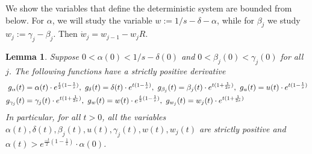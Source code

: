 \documentclass[a4paper,12pt]{article}
\newtheorem{lemma}{Lemma}
\begin{document}
We show the variables that define the deterministic system are bounded from below. For $\alpha$, we will study the variable $w := 1/s - \delta - \alpha$, while for $\beta_j$ we study $w_j := \gamma_j - \beta_j$. Then $\dot{w}_j = w_{j-1} - w_j R$.

\begin{lemma} \label{lem:bounded_differential}
Suppose $0 < \alpha(0) < 1/s - \delta(0)$ and $0 < \beta_j(0) < \gamma_j(0)$ for all $j$.
The following functions have a strictly positive derivative
\begin{align} \label{eq:positive_derivatives}
g_{\alpha}(t) & = \alpha(t) \cdot e^{\frac{t}{2}(1-\frac{1}{s})}, \, \, g_{\delta}(t) = \delta(t)\cdot  e^{t(1-\frac{1}{s})} , \, \,
g_{\beta_j}(t) = \beta_j(t) \cdot e^{t(1+\frac{1}{2s})} , \, \,
g_{u}(t) = u(t) \cdot e^{t(1-\frac{1}{s})} \notag \\
g_{\gamma_j}(t) & =  \gamma_j(t) \cdot e^{t(1+\frac{1}{2s})} , \, \,
g_{w}(t) = w(t) \cdot e^{\frac{t}{2} (1 - \frac{1}{s})} , \, \,
g_{w_j}(t) = w_j(t) \cdot e^{t(1+\frac{1}{2s})}
\end{align}
In particular, for all $t > 0$, all the variables $\alpha(t),\delta(t),\beta_j(t),u(t),\gamma_j(t),w(t),w_j(t)$ are strictly positive  and $\alpha(t) > e^{\frac{-t}{2}(1-\frac{1}{s})} \cdot \alpha(0)$.
\end{lemma}
\end{document}
